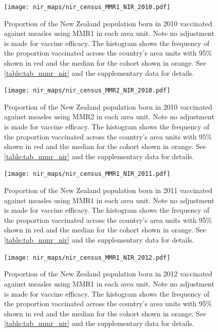 \documentclass{article}
\begin{document}
\begin{figure}
\begin{center}
    \texttt{[image: nir\_maps/nir\_census\_MMR1\_NIR\_2010.pdf]}
\end{center}
    \caption{Proportion of the New Zealand population born in 2010 vaccinated against measles using MMR1 in each area unit. Note no adjustment is made for vaccine efficacy. The histogram shows the frequency of the proportion vaccinated across the country's area units with 95\% shown in red and the median for the cohort shown in orange. See \autoref{table:tab_mmr_nir} and the supplementary data for details.}
\label{fig:fig12010}
\end{figure}


\begin{figure}
\begin{center}
    \texttt{[image: nir\_maps/nir\_census\_MMR2\_NIR\_2010.pdf]}
 \end{center}
    \caption{Proportion of the New Zealand population born in 2010 vaccinated against measles using MMR2 in each area unit. Note no adjustment is made for vaccine efficacy. The histogram shows the frequency of the proportion vaccinated across the country's area units with 95\% shown in red and the median for the cohort shown in orange. See \autoref{table:tab_mmr_nir} and the supplementary data for details.}
\label{fig:fig22010}
\end{figure}


\begin{figure}
\begin{center}
    \texttt{[image: nir\_maps/nir\_census\_MMR1\_NIR\_2011.pdf]}
 \end{center}
    \caption{Proportion of the New Zealand population born in 2011 vaccinated against measles using MMR1 in each area unit. Note no adjustment is made for vaccine efficacy. The histogram shows the frequency of the proportion vaccinated across the country's area units with 95\% shown in red and the median for the cohort shown in orange. See \autoref{table:tab_mmr_nir} and the supplementary data for details.}
\label{fig:fig12011}
\end{figure}



\begin{figure}
\begin{center}
    \texttt{[image: nir\_maps/nir\_census\_MMR1\_NIR\_2012.pdf]}
 \end{center}
    \caption{Proportion of the New Zealand population born in 2012 vaccinated against measles using MMR1 in each area unit. Note no adjustment is made for vaccine efficacy. The histogram shows the frequency of the proportion vaccinated across the country's area units with 95\% shown in red and the median for the cohort shown in orange. See \autoref{table:tab_mmr_nir} and the supplementary data for details.}
\label{fig:fig12012}
\end{figure}
\end{document}
